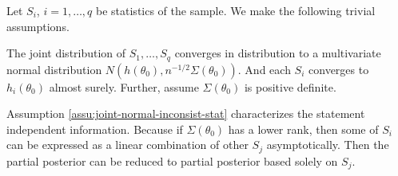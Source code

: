 Let $S_{i}$, $i=1,\ldots,q$ be statistics of the sample. We make
the following trivial assumptions. 
\begin{assumption}
\label{assu:joint-normal-inconsist-stat}The joint distribution of
$S_{1},\ldots,S_{q}$ converges in distribution to a multivariate
normal distribution $N\left(h\left(\theta_{0}\right),n^{-1/2}\Sigma\left(\theta_{0}\right)\right)$.
And each $S_{i}$ converges to $h_{i}\left(\theta_{0}\right)$ almost
surely. Further, assume $\Sigma\left(\theta_{0}\right)$ {{}
} {is } positive definite. 
\end{assumption}
Assumption \ref{assu:joint-normal-inconsist-stat} characterizes the
statement independent information. Because if $\Sigma\left(\theta_{0}\right)$
has a lower rank, then some of $S_{i}$ can be expressed as  {a
}linear combination of {{} } {other } $S_{j}$
asymptotically. Then the partial posterior can be reduced to partial
posterior based solely on $S_{j}$.

